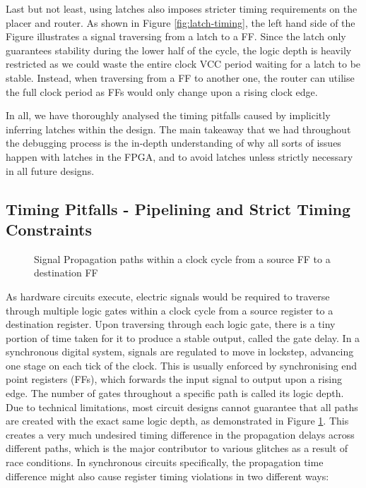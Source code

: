 \documentclass[a4paper]{report}
\begin{document}
Last but not least, using latches also imposes stricter timing requirements on the placer and router. As shown in Figure \ref{fig:latch-timing}, the left hand side of the Figure illustrates a signal traversing from a latch to a FF. Since the latch only guarantees stability during the lower half of the cycle, the logic depth is heavily restricted as we could waste the entire clock VCC period waiting for a latch to be stable. Instead, when traversing from a FF to another one, the router can utilise the full clock period as FFs would only change upon a rising clock edge.

In all, we have thoroughly analysed the timing pitfalls caused by implicitly inferring latches within the design. The main takeaway that we had throughout the debugging process is the in-depth understanding of why all sorts of issues happen with latches in the FPGA, and to avoid latches unless strictly necessary in all future designs.

\subsection{Timing Pitfalls - Pipelining and Strict Timing Constraints}
\label{section:implementation-hardware-implementation-timing}

\begin{figure}[h!]
  \caption{Signal Propagation paths within a clock cycle from a source FF to a destination FF}
  \label{fig:timing-path}
\end{figure}

As hardware circuits execute, electric signals would be required to traverse through multiple logic gates within a clock cycle from a source register to a destination register. Upon traversing through each logic gate, there is a tiny portion of time taken for it to produce a stable output, called the gate delay. In a synchronous digital system, signals are regulated to move in lockstep, advancing one stage on each tick of the clock. This is usually enforced by synchronising end point registers (FFs), which forwards the input signal to output upon a rising edge. The number of gates throughout a specific path is called its logic depth. Due to technical limitations, most circuit designs cannot guarantee that all paths are created with the exact same logic depth, as demonstrated in Figure \ref{fig:timing-path}. This creates a very much undesired timing difference in the propagation delays across different paths, which is the major contributor to various glitches as a result of race conditions. In synchronous circuits specifically, the propagation time difference might also cause register timing violations in two different ways:
\end{document}
